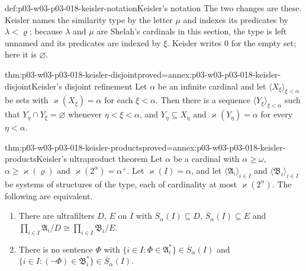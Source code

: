 \begin{hbconvention}{def:p03-w03-p03-018-keisler-notation}{Keisler's notation}
The two changes are these.  Keisler names the similarity type by the letter
\(\mu\) and indexes its predicates by \(\lambda<\varrho\); because \(\lambda\)
and \(\mu\) are Shelah's cardinals in this section, the type is left unnamed
and its predicates are indexed by \(\xi\).  Keisler writes \(0\) for the empty
set; here it is \(\varnothing\).
\end{hbconvention}

\begin{hblemma}{thm:p03-w03-p03-018-keisler-disjoint}{proved=annex:p03-w03-p03-018-keisler-disjoint}{Keisler's disjoint refinement}
Let \(\alpha\) be an infinite cardinal and let
\(\langle X_\xi\rangle_{\xi<\alpha}\) be sets with
\(\varkappa(X_\xi)=\alpha\) for each \(\xi<\alpha\).  Then there is a
sequence \(\langle Y_\xi\rangle_{\xi<\alpha}\) such that
\(Y_\eta\cap Y_\xi=\varnothing\) whenever \(\eta<\xi<\alpha\), and
\(Y_\eta\subseteq X_\eta\) and \(\varkappa(Y_\eta)=\alpha\) for every
\(\eta<\alpha\).
\end{hblemma}

\begin{hbtheorem}{thm:p03-w03-p03-018-keisler-products}{proved=annex:p03-w03-p03-018-keisler-products}{Keisler's ultraproduct theorem}
Let \(\alpha\) be a cardinal with \(\alpha\ge\omega\),
\(\alpha\ge\varkappa(\varrho)\) and \(\varkappa(2^\alpha)=\alpha^+\).  Let
\(\varkappa(I)=\alpha\), and let \(\langle\mathfrak A_i\rangle_{i\in I}\) and
\(\langle\mathfrak B_i\rangle_{i\in I}\) be systems of structures of the type,
each of cardinality at most \(\varkappa(2^\alpha)\).  The following are
equivalent.
\begin{enumerate}
  \item[(i)] There are ultrafilters \(D\), \(E\) on \(I\) with
        \(\overline S_\alpha(I)\subseteq D\), \(\overline S_\alpha(I)\subseteq E\)
        and \(\prod_{i\in I}\mathfrak A_i/D\cong\prod_{i\in I}\mathfrak B_i/E\).
  \item[(ii)] There is no sentence \(\Phi\) with
        \(\{i\in I:\Phi\in\mathfrak A_i^*\}\in\overline S_\alpha(I)\) and
        \(\{i\in I:(\neg\Phi)\in\mathfrak B_i^*\}\in\overline S_\alpha(I)\).
\end{enumerate}
\end{hbtheorem}

